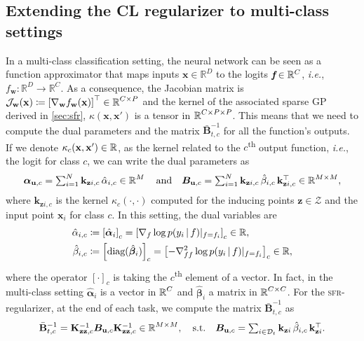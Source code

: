 \documentclass{article}
\makeatletter
\newcommand{\ie}{\textit{i.e.\@}\xspace}
\newcommand{\our}{\textsc{sfr}\xspace}
\newcommand{\dataset}{\ensuremath{\mathcal{D}}}
\newcommand{\inputDomain}{\ensuremath{\mathbb{R}^{D}}}
\newcommand{\outputDomain}{\ensuremath{\mathbb{R}^{C}}}
\newcommand{\weights}{\ensuremath{\mathbf{w}}}
\newcommand{\mathbold}[1]{\bm{#1}}
\newcommand{\mbf}[1]{\mathbf{#1}}
\renewcommand{\mid}{\,|\,}
\newcommand{\MB}{\mbf{B}}
\newcommand{\T}{\top}
\newcommand{\valpha}[0]{\mathbold{\alpha}}
\newcommand{\vbeta}[0]{\mathbold{\beta}}
\newcommand{\MBeta}[0]{\mathbold{B}}
\newcommand{\vz}{\mbf{z}}
\newcommand{\vu}{\mbf{u}}
\newcommand{\vx}{\mbf{x}}
\newcommand{\Jac}[2]{\mathcal{J}_{#1}(#2)}
\newcommand{\MKzzc}{\mbf{K}_{\mbf{z}\mbf{z}, c}}
\newcommand{\vkzi}{\mbf{k}_{\mbf{z}i}}
\newcommand{\vkzic}{\mbf{k}_{\mbf{z}i,c}}
\makeatother
\begin{document}
\subsection{Extending the CL regularizer to multi-class settings} 
\label{sec:cl_multioutput}
%
In a multi-class classification setting, the neural network can be seen as a function approximator that maps inputs $\vx \in \inputDomain$ to the logits $\textit{\textbf{f}} \in \outputDomain$, \ie, $f_\mathbf{w}: \inputDomain \to \outputDomain$. As a consequence, the Jacobian matrix is $\Jac{\weights}{\vx} \coloneqq \left[ \nabla_\weights f_\weights(\vx)\right]^\top \in \R^{C \times P}$ and the kernel of the associated sparse GP derived in \cref{sec:sfr}, $\kappa(\vx, \vx')$ is a tensor in $\operatorname{\mathbb{R}}^{C \times P \times P}$. This means that we need to compute the dual parameters and the matrix $\bar{\MB}^{-1}_{t, c}$ for all the function's outputs. If we denote $\kappa_c(\vx, \vx') \in \R$, as the kernel related to the $c$\textsuperscript{th} output function, \ie, the logit for class $c$, we can write the dual parameters as
%
\begin{equation} \textstyle
  \valpha_{\vu, c}  =  \sum_{i=1}^N  \vkzic \, \hat{\alpha}_{i, c} \in \R^{M}
  \quad \text{and} \quad
  \MBeta_{\vu, c} =  \sum_{i=1}^N \vkzic \,\hat{\beta}_{i, c} \, \vkzic^{\T} \in \R^{M \times M} ,    
\label{eq:dual_sparse}
\end{equation}
%
where $\vkzic$ is the kernel $\kappa_c(\cdot, \cdot)$ computed for the inducing points $\vz \in \mathcal{Z}$ and the input point $\vx_i$ for class $c$. In this setting, the dual variables are
\begin{equation}
\begin{aligned}
  \hat{\alpha}_{i,c} &\coloneqq  \left[\hat{\valpha}_{i}\right]_c = \left[\nabla_{f}\log p(y_i \mid f) |_{f=f_i} \right]_c \in \R,\\
  \hat{\beta}_{i,c} &\coloneqq \left[\textrm{diag}(\hat{\vbeta}_i)\right]_c = \left[ - \nabla^2_{ff}\log p(y_i \mid f) |_{f=f_i} \right]_c \in \R,
\end{aligned}
\end{equation}
where the operator $[ \cdot ]_c$ is taking the $c$\textsuperscript{th} element of a vector. In fact, in the multi-class setting $\hat{\valpha}_{i}$ is a vector in $\operatorname{\mathbb{R}}^C$ and $\hat{\vbeta}_{i}$ a matrix in $\operatorname{\mathbb{R}}^{C \times C}$.
For the \our-regularizer, at the end of each task, we compute the matrix $\bar{\MB}^{-1}_{t, c}$ as 
\begin{equation}\textstyle
 	\bar{\MB}^{-1}_{t, c} = \MKzzc^{-1} \MBeta_{\vu, c} \MKzzc^{-1} \in \R^{M \times M}, 
 	\quad \text{s.t.} \quad
 	\MBeta_{\vu, c} =  \sum_{i \in \dataset_t} \vkzi \,\hat{\beta}_{i, c} \, \vkzi^{\T}.
\end{equation}
\end{document}
